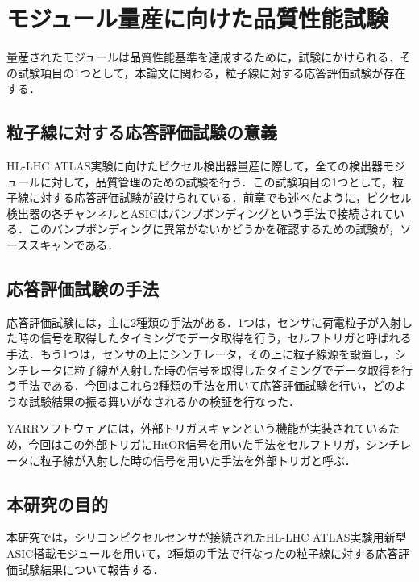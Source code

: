 \section{モジュール量産に向けた品質性能試験}
\label{sec:moduletest}
量産されたモジュールは品質性能基準を達成するために，試験にかけられる．その試験項目の1つとして，本論文に関わる，粒子線に対する応答評価試験が存在する．

\subsection{粒子線に対する応答評価試験の意義}
HL-LHC ATLAS実験に向けたピクセル検出器量産に際して，全ての検出器モジュールに対して，品質管理のための試験を行う．この試験項目の1つとして，粒子線に対する応答評価試験が設けられている．前章でも述べたように，ピクセル検出器の各チャンネルとASICはバンプボンディングという手法で接続されている．このバンプボンディングに異常がないかどうかを確認するための試験が，ソーススキャンである．\par

\subsection{応答評価試験の手法}
応答評価試験には，主に2種類の手法がある．1つは，センサに荷電粒子が入射した時の信号を取得したタイミングでデータ取得を行う，セルフトリガと呼ばれる手法．もう1つは，センサの上にシンチレータ，その上に粒子線源を設置し，シンチレータに粒子線が入射した時の信号を取得したタイミングでデータ取得を行う手法である．今回はこれら2種類の手法を用いて応答評価試験を行い，どのような試験結果の振る舞いがなされるかの検証を行なった．\par
YARRソフトウェアには，外部トリガスキャンという機能が実装されているため，今回はこの外部トリガにHitOR信号を用いた手法をセルフトリガ，シンチレータに粒子線が入射した時の信号を用いた手法を外部トリガと呼ぶ．

\subsection{本研究の目的}
本研究では，シリコンピクセルセンサが接続されたHL-LHC ATLAS実験用新型ASIC搭載モジュールを用いて，2種類の手法で行なったの粒子線に対する応答評価試験結果について報告する．
